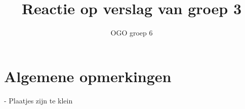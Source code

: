 \documentclass[12pt]{article}
\author{OGO groep 6}
\title{Reactie op verslag van groep 3}
\date{}
\begin{document}
  \maketitle
  \section{Algemene opmerkingen}
  - Plaatjes zijn te klein
\end{document}
